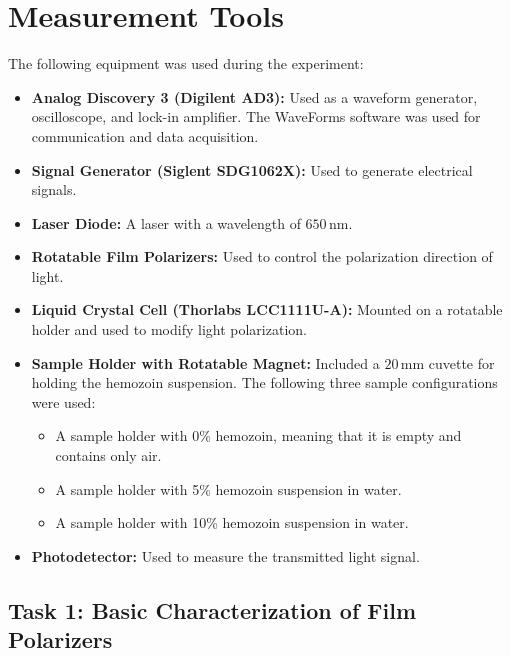 \documentclass[12pt,a4paper]{article}
\begin{document}
\section{Measurement Tools}

The following equipment was used during the experiment:

\begin{itemize}
    \item \textbf{Analog Discovery 3 (Digilent AD3):}
    Used as a waveform generator, oscilloscope, and lock-in amplifier.
    The WaveForms software was used for communication and data acquisition.

    \item \textbf{Signal Generator (Siglent SDG1062X):}
    Used to generate electrical signals.

    \item \textbf{Laser Diode:}
    A laser with a wavelength of \(650\,\mathrm{nm}\).

    \item \textbf{Rotatable Film Polarizers:}
    Used to control the polarization direction of light.

    \item \textbf{Liquid Crystal Cell (Thorlabs LCC1111U-A):}
    Mounted on a rotatable holder and used to modify light polarization.

    \item \textbf{Sample Holder with Rotatable Magnet:}
    Included a \(20\,\mathrm{mm}\) cuvette for holding the hemozoin suspension. The following three sample configurations were used:
    \begin{itemize}
        \item A sample holder with 0\% hemozoin, meaning that it is empty and contains only air.
        \item A sample holder with 5\% hemozoin suspension in water.
        \item A sample holder with 10\% hemozoin suspension in water.
    \end{itemize}

    \item \textbf{Photodetector:}
    Used to measure the transmitted light signal.
\end{itemize}











\subsection{Task 1: Basic Characterization of Film Polarizers}
\end{document}
